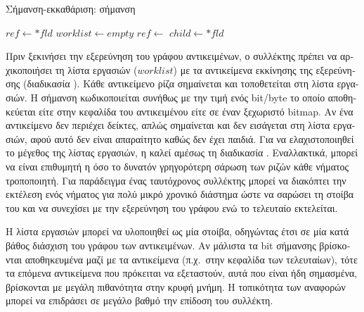 \begin{greek}
\begin{algorithm}
  \caption{Σήμανση-εκκαθάριση: σήμανση}
  \label{alg:mrkswp_2}
  \begin{algorithmic}[1]
      \State {}
        \State $ref \gets *fld$
          \State {}
          \State {}
          \State {}
        \EndIf
      \EndFor
    \EndProcedure
    \Statex
      \State $worklist \gets empty$
    \EndProcedure
    \Statex
        \State $ref \gets$ 
          \State $child \gets *fld$
            \State {}
            \State {}
          \EndIf
        \EndFor
      \EndWhile
    \EndProcedure
  \end{algorithmic}
\end{algorithm}

Πριν ξεκινήσει την εξερεύνηση του γράφου αντικειμένων, ο
συλλέκτης πρέπει να αρχικοποιήσει τη λίστα εργασιών ($worklist$) 
με τα αντικείμενα εκκίνησης της εξερεύνησης (διαδικασία
\textenglish{}). Κάθε αντικείμενο ρίζα σημαίνεται 
και τοποθετείται στη λίστα εργασιών. Η σήμανση κωδικοποιείται 
συνήθως με την τιμή ενός bit/byte το οποίο αποθηκεύεται είτε 
στην κεφαλίδα του αντικειμένου είτε σε έναν ξεχωριστό bitmap. Αν ένα αντικείμενο δεν περιέχει δείκτες, 
απλώς σημαίνεται και δεν εισάγεται στη λίστα εργασιών, αφού 
αυτό δεν είναι απαραίτητο καθώς δεν έχει παιδιά. Για να
ελαχιστοποιηθεί το μέγεθος της λίστας εργασιών, η 
\textenglish{} καλεί αμέσως τη διαδικασία
\textenglish{}. Εναλλακτικά, μπορεί να είναι επιθυμητή
η όσο το δυνατόν γρηγορότερη σάρωση των ριζών κάθε νήματος
τροποποιητή. Για παράδειγμα ένας ταυτόχρονος συλλέκτης 
μπορεί να διακόπτει την εκτέλεση ενός νήματος για πολύ
μικρό χρονικό διάστημα ώστε να σαρώσει τη στοίβα του
και να συνεχίσει με την εξερεύνηση του γράφου ενώ το
τελευταίο εκτελείται.

Η λίστα εργασιών μπορεί να υλοποιηθεί ως μία στοίβα, οδηγώντας 
έτσι σε μία κατά βάθος διάσχιση του γράφου των αντικειμένων. 
Αν μάλιστα τα bit σήμανσης βρίσκονται αποθηκευμένα μαζί με 
τα αντικείμενα (π.χ.\ στην κεφαλίδα των τελευταίων), τότε τα 
επόμενα αντικείμενα που πρόκειται να εξεταστούν, αυτά που 
είναι ήδη σημασμένα, βρίσκονται με μεγάλη πιθανότητα στην κρυφή
μνήμη. Η τοπικότητα των αναφορών μπορεί να επιδράσει
σε μεγάλο βαθμό την επίδοση του συλλέκτη.


\end{greek}
